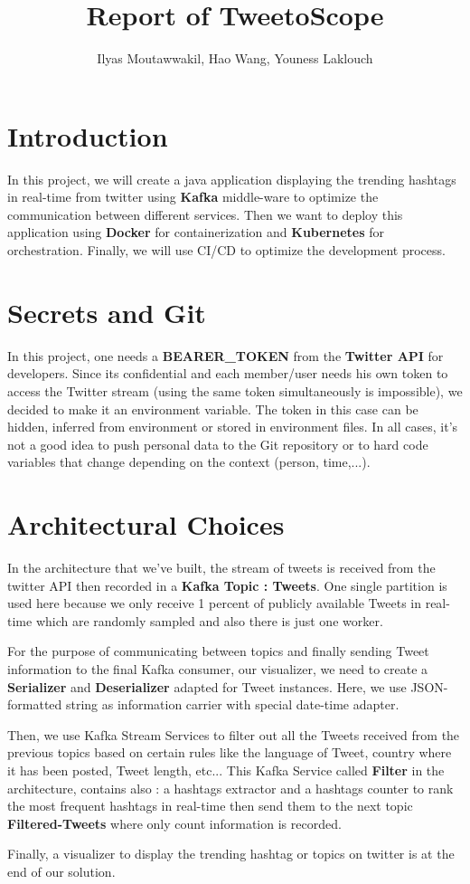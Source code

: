 \documentclass[10pt,a4paper]{article}
\title{Report of TweetoScope}
\author{Ilyas Moutawwakil, Hao Wang, Youness Laklouch}
\begin{document}
\maketitle

\section{Introduction}

In this project, we will create a java application displaying the trending hashtags in real-time from twitter using \textbf{Kafka} middle-ware to optimize the communication between different services. Then we want to deploy this application using \textbf{Docker} for containerization and \textbf{Kubernetes} for orchestration. Finally, we will use CI/CD to optimize the development process.

\section{Secrets and Git}

In this project, one needs a \textbf{BEARER\_TOKEN} from the \textbf{Twitter API} for developers.
Since its confidential and each member/user needs his own token to access the Twitter stream (using the same token simultaneously is impossible), we decided to make it an environment variable. The token in this case can be hidden, inferred from environment or stored in environment files. In all cases, it's not a good idea to push personal data to the Git repository or to hard code variables that change depending on the context (person, time,...).

\section{Architectural Choices}
\par
In the architecture that we've built, the stream of tweets is received from the twitter API then recorded in a \textbf{Kafka Topic : Tweets}. One single partition is used here because we only receive 1 percent of publicly available Tweets in real-time which are randomly sampled and also there is just one worker. 
\par
For the purpose of communicating between topics and finally sending Tweet information to the final Kafka consumer, our visualizer, we need to create a \textbf{Serializer} and \textbf{Deserializer} adapted for Tweet instances. Here, we use JSON-formatted string as information carrier with special date-time adapter.
\par
Then, we use Kafka Stream Services to filter out all the Tweets received from the previous topics based on certain rules like the language of Tweet, country where it has been posted, Tweet length, etc... This Kafka Service called \textbf{Filter} in the architecture, contains also : a hashtags extractor and a hashtags counter to rank the most frequent hashtags in real-time then send them to the next topic \textbf{Filtered-Tweets} where only count information is recorded.
\par
Finally, a visualizer to display the trending hashtag or topics on twitter is at the end of our solution.
\end{document}
